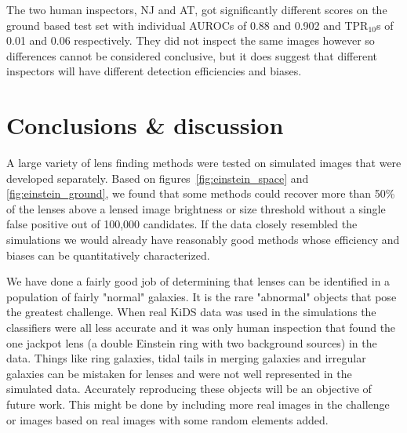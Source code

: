 \documentclass{aa}
\newcommand{\red}[1]{{\color{red} #1}}
\begin{document}
The two human inspectors, NJ and AT, got significantly different scores on the ground based test set with individual AUROCs of 0.88 and 0.902 and TPR$_{10}$s of 0.01 and 0.06 respectively.  They did not inspect the same images however so differences cannot be considered conclusive, but it does suggest that different inspectors will have different detection efficiencies and biases.


\section{Conclusions \& discussion}
\label{sec:conclusion}

A large variety of lens finding methods were tested on simulated images that were developed separately.    Based on figures~\ref{fig:einstein_space} and \ref{fig:einstein_ground}, we found that some methods could recover more than 50\% of the lenses above a lensed image brightness or size threshold without a single false positive out of 100,000 candidates.  If the data closely resembled the simulations we would already have reasonably good methods whose efficiency and biases can be quantitatively characterized.

We have done a fairly good job of determining that lenses can be identified in a population of fairly "normal" galaxies.  It is the rare "abnormal" objects that pose the greatest challenge.  When real KiDS data was used in the simulations the classifiers were all less accurate and it was only human inspection that found the one jackpot lens (a double Einstein ring with two background sources) in the data.  Things like ring galaxies, tidal tails in merging galaxies and irregular galaxies can be mistaken for lenses and were not well represented in the simulated data.  Accurately reproducing these objects will be an objective of future work.  This might be done by including more real images in the challenge or images based on real images with some random elements added.
\end{document}
